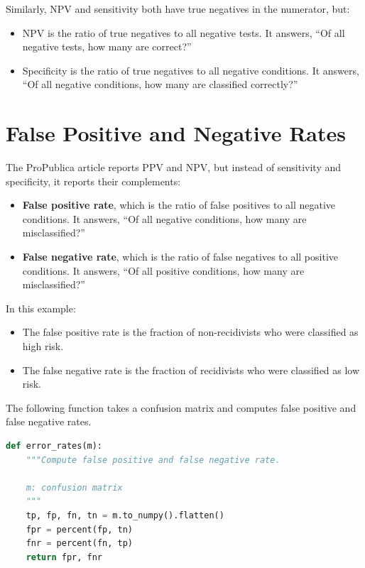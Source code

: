 Similarly, NPV and sensitivity both have true negatives in the
numerator, but:

\begin{itemize}
\item
  NPV is the ratio of true negatives to all negative tests. It answers,
  ``Of all negative tests, how many are correct?''
\item
  Specificity is the ratio of true negatives to all negative conditions.
  It answers, ``Of all negative conditions, how many are classified
  correctly?''
\end{itemize}

\hypertarget{false-positive-and-negative-rates}{%
\section{False Positive and Negative
Rates}\label{false-positive-and-negative-rates}}

The ProPublica article reports PPV and NPV, but instead of sensitivity
and specificity, it reports their complements:

\begin{itemize}
\item
  \textbf{False positive rate}, which is the ratio of false positives to
  all negative conditions. It answers, ``Of all negative conditions, how
  many are misclassified?''
\item
  \textbf{False negative rate}, which is the ratio of false negatives to
  all positive conditions. It answers, ``Of all positive conditions, how
  many are misclassified?''
\end{itemize}

In this example:

\begin{itemize}
\item
  The false positive rate is the fraction of non-recidivists who were
  classified as high risk.
\item
  The false negative rate is the fraction of recidivists who were
  classified as low risk.
\end{itemize}

The following function takes a confusion matrix and computes false
positive and false negative rates.

\begin{lstlisting}[language=Python]
def error_rates(m):
    """Compute false positive and false negative rate.
    
    m: confusion matrix
    """
    tp, fp, fn, tn = m.to_numpy().flatten()
    fpr = percent(fp, tn)
    fnr = percent(fn, tp)
    return fpr, fnr
\end{lstlisting}


